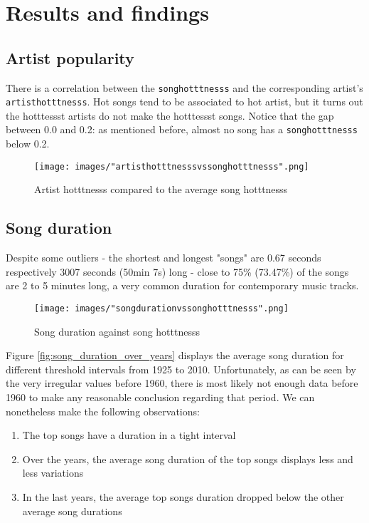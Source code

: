 \documentclass[11pt]{article}
\renewcommand\_{\textunderscore\allowbreak}
\begin{document}
\section{Results and findings}


\subsection{Artist popularity}
There is a correlation between the \texttt{song\_hotttnesss} and the corresponding artist's \texttt{artist\_hotttnesss}.
Hot songs tend to be associated to hot artist, but it turns out the hotttessst artists do not make the hotttessst songs.
Notice that the gap between 0.0 and 0.2: as mentioned before, almost no song has a \texttt{song\_hotttnesss} below 0.2.

\begin{figure}[h!]
\centering
\captionsetup{width=1.0\textwidth}
\texttt{[image: images/"artist\_hotttnesss\_vs\_song\_hotttnesss".png]}
\caption{Artist hotttnesss compared to the average song hotttnesss}
\label{fig:artist_hotttnesss}
\end{figure}

\subsection{Song duration}
Despite some outliers - the shortest and longest "songs" are 0.67 seconds respectively 3007 seconds (50min 7s) long - close to 75\% (73.47\%) of the songs are 2 to 5 minutes long, a very common duration for contemporary music tracks.

\begin{figure}[h!]
\centering
\captionsetup{width=1.0\textwidth}
\texttt{[image: images/"song\_duration\_vs\_song\_hotttnesss".png]}
\caption{Song duration against song hotttnesss}
\label{fig:song_duration}
\end{figure}

Figure \ref{fig:song_duration_over_years} displays the average song duration for different threshold intervals from 1925 to 2010. 
Unfortunately, as can be seen by the very irregular values before 1960, there is most likely not enough data before 1960 to make any reasonable conclusion regarding that period. 
We can nonetheless make the following observations:
\begin{enumerate}
\itemsep 0mm
\item The top songs have a duration in a tight interval
\item Over the years, the average song duration of the top songs displays less and less variations
\item In the last years, the average top songs duration dropped below the other average song durations
\end{enumerate}
\end{document}
